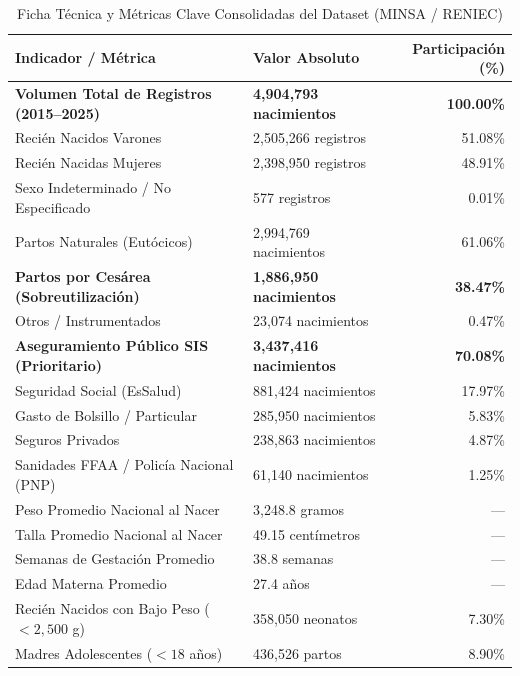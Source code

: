 \documentclass[12pt,a4paper]{article}
\begin{document}
\begin{table}[H]
\centering
\small
\caption{Ficha Técnica y Métricas Clave Consolidadas del Dataset (MINSA / RENIEC)}
\begin{tabular}{llr}
\toprule
\textbf{Indicador / Métrica} & \textbf{Valor Absoluto} & \textbf{Participación (\%)} \\
\midrule
\textbf{Volumen Total de Registros (2015--2025)} & \textbf{4,904,793 nacimientos} & \textbf{100.00\%} \\
Recién Nacidos Varones & 2,505,266 registros & 51.08\% \\
Recién Nacidas Mujeres & 2,398,950 registros & 48.91\% \\
Sexo Indeterminado / No Especificado & 577 registros & 0.01\% \\
\midrule
Partos Naturales (Eutócicos) & 2,994,769 nacimientos & 61.06\% \\
\textbf{Partos por Cesárea (Sobreutilización)} & \textbf{1,886,950 nacimientos} & \textbf{38.47\%} \\
Otros / Instrumentados & 23,074 nacimientos & 0.47\% \\
\midrule
\textbf{Aseguramiento Público SIS (Prioritario)} & \textbf{3,437,416 nacimientos} & \textbf{70.08\%} \\
Seguridad Social (EsSalud) & 881,424 nacimientos & 17.97\% \\
Gasto de Bolsillo / Particular & 285,950 nacimientos & 5.83\% \\
Seguros Privados & 238,863 nacimientos & 4.87\% \\
Sanidades FFAA / Policía Nacional (PNP) & 61,140 nacimientos & 1.25\% \\
\midrule
Peso Promedio Nacional al Nacer & 3,248.8 gramos & --- \\
Talla Promedio Nacional al Nacer & 49.15 centímetros & --- \\
Semanas de Gestación Promedio & 38.8 semanas & --- \\
Edad Materna Promedio & 27.4 años & --- \\
Recién Nacidos con Bajo Peso ($<2,500$ g) & 358,050 neonatos & 7.30\% \\
Madres Adolescentes ($<18$ años) & 436,526 partos & 8.90\% \\
\bottomrule
\end{tabular}
\end{table}

\newpage

\end{document}
